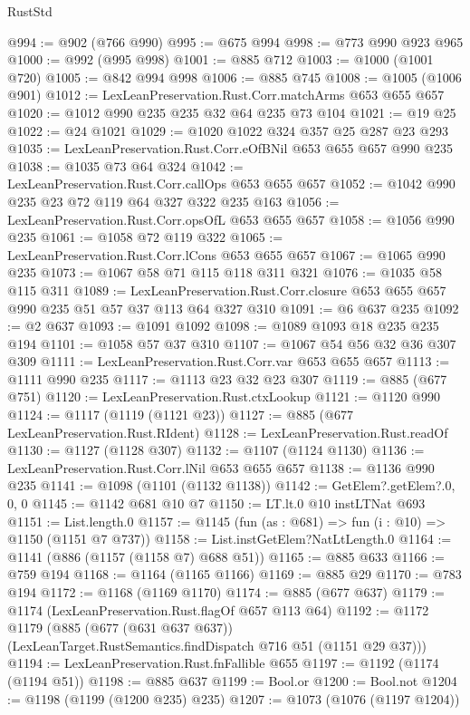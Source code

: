 \begin{lexlean}{RustStd}
\begin{coremodule}
@994 := @902 (@766 @990)
@995 := @675 @994
@998 := @773 @990 @923 @965
@1000 := @992 (@995 @998)
@1001 := @885 @712
@1003 := @1000 (@1001 @720)
@1005 := @842 @994 @998
@1006 := @885 @745
@1008 := @1005 (@1006 @901)
@1012 := LexLeanPreservation.Rust.Corr.matchArms @653 @655 @657
@1020 := @1012 @990 @235 @235 @32 @64 @235 @73 @104
@1021 := @19 @25
@1022 := @24 @1021
@1029 := @1020 @1022 @324 @357 @25 @287 @23 @293
@1035 := LexLeanPreservation.Rust.Corr.eOfBNil @653 @655 @657 @990 @235
@1038 := @1035 @73 @64 @324
@1042 := LexLeanPreservation.Rust.Corr.callOps @653 @655 @657
@1052 := @1042 @990 @235 @23 @72 @119 @64 @327 @322 @235 @163
@1056 := LexLeanPreservation.Rust.Corr.opsOfL @653 @655 @657
@1058 := @1056 @990 @235
@1061 := @1058 @72 @119 @322
@1065 := LexLeanPreservation.Rust.Corr.lCons @653 @655 @657
@1067 := @1065 @990 @235
@1073 := @1067 @58 @71 @115 @118 @311 @321
@1076 := @1035 @58 @115 @311
@1089 := LexLeanPreservation.Rust.Corr.closure
    @653
    @655
    @657
    @990
    @235
    @51
    @57
    @37
    @113
    @64
    @327
    @310
@1091 := @6 @637 @235
@1092 := @2 @637
@1093 := @1091 @1092
@1098 := @1089 @1093 @18 @235 @235 @194
@1101 := @1058 @57 @37 @310
@1107 := @1067 @54 @56 @32 @36 @307 @309
@1111 := LexLeanPreservation.Rust.Corr.var @653 @655 @657
@1113 := @1111 @990 @235
@1117 := @1113 @23 @32 @23 @307
@1119 := @885 (@677 @751)
@1120 := LexLeanPreservation.Rust.ctxLookup
@1121 := @1120 @990
@1124 := @1117 (@1119 (@1121 @23))
@1127 := @885 (@677 LexLeanPreservation.Rust.RIdent)
@1128 := LexLeanPreservation.Rust.readOf
@1130 := @1127 (@1128 @307)
@1132 := @1107 (@1124 @1130)
@1136 := LexLeanPreservation.Rust.Corr.lNil @653 @655 @657
@1138 := @1136 @990 @235
@1141 := @1098 (@1101 (@1132 @1138))
@1142 := GetElem?.getElem?.{0, 0, 0}
@1145 := @1142 @681 @10 @7
@1150 := LT.lt.{0} @10 instLTNat @693
@1151 := List.length.{0}
@1157 := @1145 (fun (as : @681) => fun (i : @10) => @1150 (@1151 @7 @737))
@1158 := List.instGetElem?NatLtLength.{0}
@1164 := @1141 (@886 (@1157 (@1158 @7) @688 @51))
@1165 := @885 @633
@1166 := @759 @194
@1168 := @1164 (@1165 @1166)
@1169 := @885 @29
@1170 := @783 @194
@1172 := @1168 (@1169 @1170)
@1174 := @885 (@677 @637)
@1179 := @1174 (LexLeanPreservation.Rust.flagOf @657 @113 @64)
@1192 := @1172
    @1179
    (@885
      (@677 (@631 @637 @637))
      (LexLeanTarget.RustSemantics.findDispatch @716 @51 (@1151 @29 @37)))
@1194 := LexLeanPreservation.Rust.fnFallible @655
@1197 := @1192 (@1174 (@1194 @51))
@1198 := @885 @637
@1199 := Bool.or
@1200 := Bool.not
@1204 := @1198 (@1199 (@1200 @235) @235)
@1207 := @1073 (@1076 (@1197 @1204))

\end{coremodule}
\end{lexlean}
